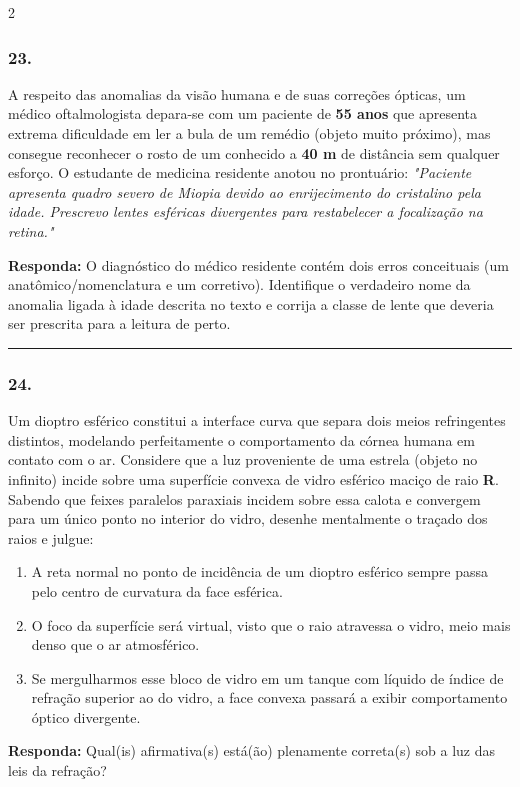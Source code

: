 \documentclass[twoside, 10pt, a4paper]{article}
\newlength{\espacoPreQuestao}\setlength{\espacoPreQuestao}{0.1cm}
\newlength{\espacoQuestao}\setlength{\espacoQuestao}{0.2cm}
\newlength{\espacoAlt}\setlength{\espacoAlt}{0.2cm}
\begin{document}
\begin{multicols*}{2}
\subsubsection*{23.} A respeito das anomalias da visão humana e de suas correções ópticas, um médico oftalmologista depara-se com um paciente de \textbf{55 anos} que apresenta extrema dificuldade em ler a bula de um remédio (objeto muito próximo), mas consegue reconhecer o rosto de um conhecido a \textbf{40 m} de distância sem qualquer esforço. 
O estudante de medicina residente anotou no prontuário: \textit{"Paciente apresenta quadro severo de Miopia devido ao enrijecimento do cristalino pela idade. Prescrevo lentes esféricas divergentes para restabelecer a focalização na retina."}
\begin{boxresponda}
\textbf{Responda:} O diagnóstico do médico residente contém dois erros conceituais (um anatômico/nomenclatura e um corretivo). Identifique o verdadeiro nome da anomalia ligada à idade descrita no texto e corrija a classe de lente que deveria ser prescrita para a leitura de perto.
\end{boxresponda}
\par\vspace{\espacoQuestao}

\noindent\textcolor{CorLinha}{\rule{\linewidth}{0.5pt}} 
\par\vspace{\espacoPreQuestao}
\subsubsection*{24.} Um dioptro esférico constitui a interface curva que separa dois meios refringentes distintos, modelando perfeitamente o comportamento da córnea humana em contato com o ar. Considere que a luz proveniente de uma estrela (objeto no infinito) incide sobre uma superfície convexa de vidro esférico maciço de raio \textbf{R}. Sabendo que feixes paralelos paraxiais incidem sobre essa calota e convergem para um único ponto no interior do vidro, desenhe mentalmente o traçado dos raios e julgue:
\begin{enumerate}[label=\Roman*., itemsep=\espacoAlt]
\item A reta normal no ponto de incidência de um dioptro esférico sempre passa pelo centro de curvatura da face esférica.
\item O foco da superfície será virtual, visto que o raio atravessa o vidro, meio mais denso que o ar atmosférico.
\item Se mergulharmos esse bloco de vidro em um tanque com líquido de índice de refração superior ao do vidro, a face convexa passará a exibir comportamento óptico divergente.
\end{enumerate}
\begin{boxresponda}
\textbf{Responda:} Qual(is) afirmativa(s) está(ão) plenamente correta(s) sob a luz das leis da refração?
\end{boxresponda}
\par\vspace{\espacoQuestao}


\end{multicols*}
\end{document}
